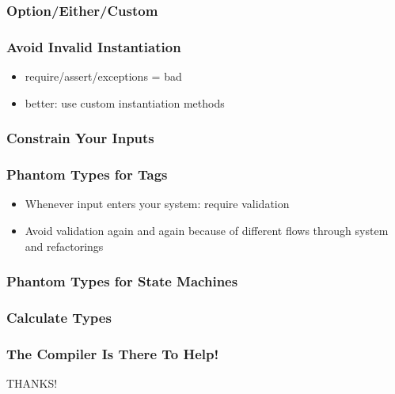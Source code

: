 \documentclass{beamer}
\begin{document}
\begin{frame}
  \frametitle{Option/Either/Custom}
\end{frame}

\begin{frame}
  \frametitle{Avoid Invalid Instantiation}
  \begin{itemize}
  \item require/assert/exceptions = bad
  \item better: use custom instantiation methods
  \end{itemize}
\end{frame}

\begin{frame}
  \frametitle{Constrain Your Inputs}
\end{frame}

\begin{frame}
  \frametitle{Phantom Types for Tags}
  \begin{itemize}
  \item Whenever input enters your system: require validation
  \item Avoid validation again and again because of different flows
    through system and refactorings
  \end{itemize}
\end{frame}

\begin{frame}
  \frametitle{Phantom Types for State Machines}
\end{frame}

\begin{frame}
  \frametitle{Calculate Types}
\end{frame}

\begin{frame}
  \frametitle{The Compiler Is There To Help!}
  \vfill
  \begin{center}
    {\Huge THANKS!}
  \end{center}
\end{frame}
\end{document}
